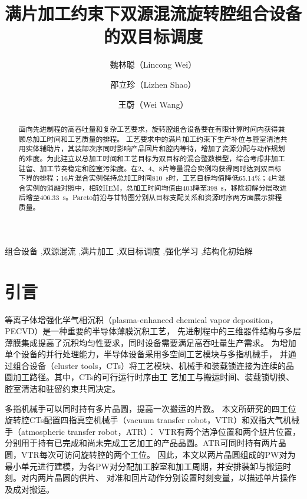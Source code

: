 \documentclass[final,5p,times,twocolumn]{elsarticle}
\begin{document}
\raggedbottom
\begin{frontmatter}

\title{满片加工约束下双源混流旋转腔组合设备的双目标调度}

\author[ustb]{魏林聪（Lincong Wei）}
\author[ustb]{邵立珍（Lizhen Shao）}
\author[ustb]{王蔚（Wei Wang）}

\address[ustb]{北京科技大学控制科学与工程系，北京市海淀区学院路30号，
北京100083，中国}

\begin{abstract}
面向先进制程的高吞吐量和复杂工艺要求，旋转腔组合设备要在有限计算时间内获得兼顾总加工时间和工艺质量的排程。
工艺要求中的满片加工约束下生产补位与腔室清洁共用实体辅助片，其装卸次序同时影响产品回片和腔内等待，增加了资源分配与动作规划的难度。为此建立以总加工时间和工艺目标为双目标的混合整数模型，综合考虑非加工驻留、加工节奏稳定和腔室污染度。在2、4、8片等量混合实例均获得同时达到双目标下界的排程；16片混合实例保持总加工时间810~s时，工艺目标均值降低65.14\%；4片混合实例的消融对照中，相较HEM，总加工时间均值由403降至398~s，移除初解分层改进后增至406.33~s。Pareto前沿与甘特图分别从目标支配关系和资源时序两方面展示排程质量。
\end{abstract}

\begin{keyword}
组合设备 \sep 双源混流 \sep 满片加工 \sep 双目标调度 \sep 强化学习 \sep 结构化初始解
\end{keyword}

\end{frontmatter}
\section{引言}

等离子体增强化学气相沉积（plasma-enhanced chemical vapor deposition，PECVD）是一种重要的半导体薄膜沉积工艺，
先进制程中的三维器件结构与多层薄膜集成提高了沉积均匀性要求，同时设备需要满足高吞吐量生产需求\citep{xia2016pecvd,kim2023onstack}。
为增加单个设备的并行处理能力，半导体设备采用多空间工艺模块与多指机械手，
并通过组合设备（cluster tools，CTs）将工艺模块、机械手和装载锁连接为连续的晶圆加工路径。其中，CTs的可行运行时序由工
艺加工与搬运时间、装载锁切换、腔室清洁和驻留约束共同决定\citep{pan2018survey}。

多指机械手可以同时持有多片晶圆，提高一次搬运的片数\citep{gu2024applied,gu2024multifinger}。
本文所研究的四工位旋转腔CTs配置四指真空机械手（vacuum transfer robot，VTR）和双指大气机械手（atmospheric transfer robot，ATR）：
VTR有两个洁净位置和两个脏片位置，分别用于持有已完成和尚未完成工艺加工的产品晶圆。ATR可同时持有两片晶圆，VTR每次可访问旋转腔的两个工位。
因此，本文以两片晶圆组成的PW对为最小单元进行建模，为各PW对分配加工腔室和加工周期，并安排装卸与搬运时刻。对内两片晶圆的供片、
对准和回片动作分别设置时刻变量，以描述单片操作及成对搬运。
\end{document}
